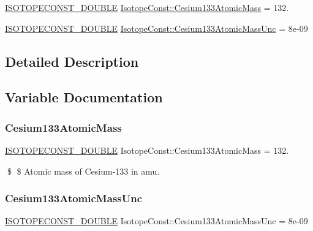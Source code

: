 \begin{DoxyCompactItemize}
\item 
\mbox{\hyperlink{group___isotope_const-_macros_ga8f45a7272ce02c0b4c65c44636ed719a}{I\+S\+O\+T\+O\+P\+E\+C\+O\+N\+S\+T\+\_\+\+D\+O\+U\+B\+LE}} \mbox{\hyperlink{group___isotope_const-_cesium-_cs133_gaab6f2c550de110bd5614a6ba4fd5dd47}{Isotope\+Const\+::\+Cesium133\+Atomic\+Mass}} = 132.
\item 
\mbox{\hyperlink{group___isotope_const-_macros_ga8f45a7272ce02c0b4c65c44636ed719a}{I\+S\+O\+T\+O\+P\+E\+C\+O\+N\+S\+T\+\_\+\+D\+O\+U\+B\+LE}} \mbox{\hyperlink{group___isotope_const-_cesium-_cs133_ga1bbfe0d355939c88ff993114e405da71}{Isotope\+Const\+::\+Cesium133\+Atomic\+Mass\+Unc}} = 8e-\/09
\end{DoxyCompactItemize}


\subsection{Detailed Description}


\subsection{Variable Documentation}
\mbox{\label{group___isotope_const-_cesium-_cs133_gaab6f2c550de110bd5614a6ba4fd5dd47}} 
\subsubsection{\texorpdfstring{Cesium133\+Atomic\+Mass}{Cesium133AtomicMass}}
{\footnotesize\ttfamily \mbox{\hyperlink{group___isotope_const-_macros_ga8f45a7272ce02c0b4c65c44636ed719a}{I\+S\+O\+T\+O\+P\+E\+C\+O\+N\+S\+T\+\_\+\+D\+O\+U\+B\+LE}} Isotope\+Const\+::\+Cesium133\+Atomic\+Mass = 132.}

\$ \$ Atomic mass of Cesium-\/133 in amu. \mbox{\label{group___isotope_const-_cesium-_cs133_ga1bbfe0d355939c88ff993114e405da71}} 
\subsubsection{\texorpdfstring{Cesium133\+Atomic\+Mass\+Unc}{Cesium133AtomicMassUnc}}
{\footnotesize\ttfamily \mbox{\hyperlink{group___isotope_const-_macros_ga8f45a7272ce02c0b4c65c44636ed719a}{I\+S\+O\+T\+O\+P\+E\+C\+O\+N\+S\+T\+\_\+\+D\+O\+U\+B\+LE}} Isotope\+Const\+::\+Cesium133\+Atomic\+Mass\+Unc = 8e-\/09}

